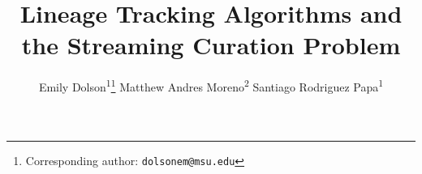 \title{ Lineage Tracking Algorithms and the Streaming Curation Problem }
\author{
    Emily Dolson\textsuperscript{1}\thanks{Corresponding author: \texttt{dolsonem@msu.edu}} \quad
    Matthew Andres Moreno\textsuperscript{2} \quad
    Santiago Rodriguez Papa\textsuperscript{1} \quad
}
\date{}

\newcommand{\affil}[1]{\textsuperscript{#1}}
\newcommand{\affiliations}{
    \affil{1} Michigan State University, East Lansing, United States \\
    \affil{2} University of Michigan, Ann Arbor, United States
}

\maketitle



